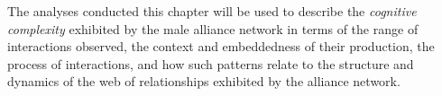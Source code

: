 \documentclass[11pt]{amsart}
\begin{document}
The analyses conducted this chapter will be used to describe the \emph{cognitive complexity} exhibited by the male alliance network in terms of the range of interactions observed, the context and embeddedness of their production, the process of interactions, and how such patterns relate to the structure and dynamics of the web of relationships exhibited by the alliance network. %


\clearpage



\end{document}
